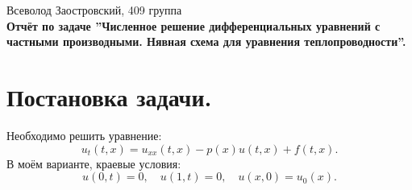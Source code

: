 \documentclass[14pt,a4paper]{extarticle}
\newcommand{\1}{\mathbbm{1}}
\begin{document}
\begin{center}

    {Всеволод Заостровский, 409 группа}\\
    {\bfseries Отчёт по задаче ''Численное решение дифференциальных уравнений с частными производными. Нявная схема для уравнения теплопроводности''.\\}
    \vspace{1cm}

\end{center}

\section{Постановка задачи.} Необходимо решить уравнение:
\begin{equation} \label{diffeq1}
    u_t(t, x) = u_{xx}(t, x) - p(x) u(t, x) + f(t, x).
\end{equation}
В моём варианте, краевые условия:
\begin{equation} \label{diffeqedge}
    u(0, t) = 0, \quad u(1, t) = 0, \quad u(x, 0) = u_0(x). 
\end{equation}
\end{document}
